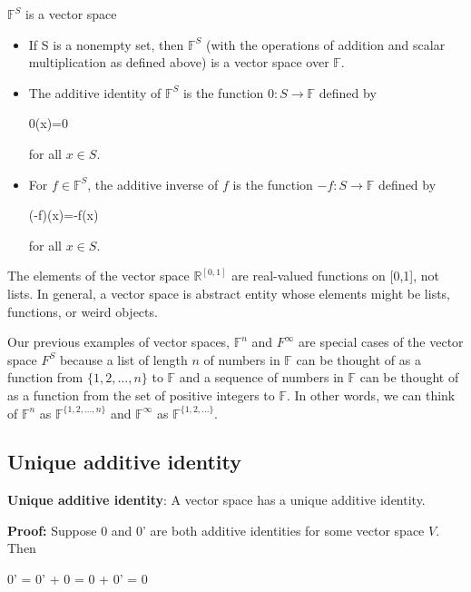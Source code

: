 \documentclass{report}
\begin{document}
\noindent $\mathbb{F}^S$ is a vector space\newline
\begin{itemize}
	\item If S is a nonempty set, then $\mathbb{F}^S$ (with the operations of addition and scalar multiplication as defined above) is a vector space over $\mathbb{F}$.
    \item The additive identity of $\mathbb{F}^S$ is the function $0: S \rightarrow \mathbb{F}$ defined by\newline
    	\centerline{0(x)=0}\newline
   	  for all $x \in S$.
    \item For $f \in \mathbb{F}^S$, the additive inverse of $f$ is the function $-f: S \rightarrow \mathbb{F}$ defined by\newline
    	\centerline{(-f)(x)=-f(x)}\newline
      for all $x \in S$.
\end{itemize}

\noindent The elements of the vector space $\mathbb{R}^{[0,1]}$ are real-valued functions on [0,1], not lists. In general, a vector space is abstract entity whose elements might be lists, functions, or weird objects.\newline

\noindent Our previous examples of vector spaces, $\mathbb{F}^n$ and $F^{\infty}$ are special cases of the vector space $F^S$ because a list of length $n$ of numbers in $\mathbb{F}$ can be thought of as a function from $\{1,2,...,n\}$ to $\mathbb{F}$ and a sequence of numbers in $\mathbb{F}$ can be thought of as a function from the set of positive integers to $\mathbb{F}$. In other words, we can think of $\mathbb{F}^n$ as $\mathbb{F}^{\{1,2,...,n\}}$ and $\mathbb{F}^{\infty}$ as $\mathbb{F}^{\{1,2,...\}}$.\newline

\subsection{Unique additive identity}
\noindent \textbf{Unique additive identity}: A vector space has a unique additive identity.\newline

\noindent \textbf{Proof:}\newline
\noindent Suppose 0 and 0' are both additive identities for some vector space $V$.\newline
\noindent Then \newline
\centerline{0' = 0' + 0 = 0 + 0' = 0}\newline\newline
\end{document}

